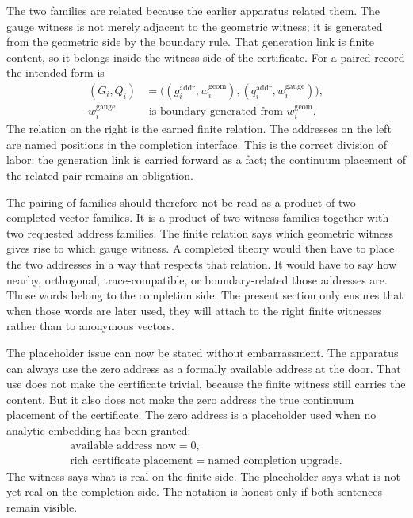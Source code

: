 The two families are related because the earlier apparatus related them. The
gauge witness is not merely adjacent to the geometric witness; it is generated
from the geometric side by the boundary rule. That generation link is finite
content, so it belongs inside the witness side of the certificate. For a paired
record the intended form is
\[
  \begin{aligned}
  (G_i,Q_i)
    &=
      \big((g_i^{\mathrm{addr}},w_i^{\mathrm{geom}}),
          (q_i^{\mathrm{addr}},w_i^{\mathrm{gauge}})\big),\\
  w_i^{\mathrm{gauge}}
    &\text{ is boundary-generated from } w_i^{\mathrm{geom}}.
  \end{aligned}
\]
The relation on the right is the earned finite relation. The addresses on the
left are named positions in the completion interface. This is the correct
division of labor: the generation link is carried forward as a fact; the
continuum placement of the related pair remains an obligation.

The pairing of families should therefore not be read as a product of two
completed vector families. It is a product of two witness families together
with two requested address families. The finite relation says which geometric
witness gives rise to which gauge witness. A completed theory would then have
to place the two addresses in a way that respects that relation. It would have
to say how nearby, orthogonal, trace-compatible, or boundary-related those
addresses are. Those words belong to the completion side. The present section
only ensures that when those words are later used, they will attach to the
right finite witnesses rather than to anonymous vectors.

The placeholder issue can now be stated without embarrassment. The apparatus
can always use the zero address as a formally available address at the door.
That use does not make the certificate trivial, because the finite witness
still carries the content. But it also does not make the zero address the true
continuum placement of the certificate. The zero address is a placeholder used
when no analytic embedding has been granted:
\[
  \begin{array}{c}
  \text{available address now} = 0,\\
  \text{rich certificate placement}
    = \text{named completion upgrade}.
  \end{array}
\]
The witness says what is real on the finite side. The placeholder says what is
not yet real on the completion side. The notation is honest only if both
sentences remain visible.

